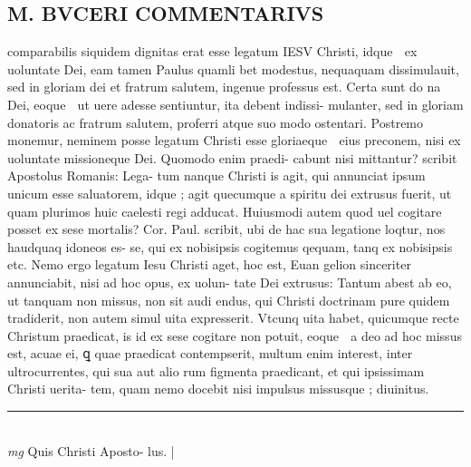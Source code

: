 \documentclass{article}
\begin{document}
\begin{pages}
\section*{M. BVCERI COMMENTARIVS }
\marginpar{[ p.18 ]}\pstart comparabilis siquidem dignitas erat esse legatum IESV Christi, idque  ex uoluntate Dei, eam tamen Paulus quamli bet modestus, nequaquam dissimulauit, sed in gloriam dei et fratrum salutem, ingenue professus est. Certa sunt do na Dei, eoque  ut uere adesse sentiuntur, ita debent indissi- mulanter, sed in gloriam donatoris ac fratrum salutem, proferri atque suo modo ostentari.  Postremo monemur, neminem posse legatum Christi esse gloriaeque  eius preconem, nisi ex uoluntate missioneque Dei.  Quomodo enim praedi- cabunt nisi mittantur? scribit Apostolus Romanis: Lega- tum nanque  Christi is agit, qui annunciat ipsum unicum esse saluatorem, idque ; agit quecumque  a spiritu dei extrusus fuerit, ut quam plurimos huic caelesti regi adducat.  Huiusmodi autem quod uel cogitare posset ex sese mortalis? Cor. Paul.  scribit, ubi de hac sua legatione loqtur, nos haudquaq idoneos es- se, qui ex nobisipsis cogitemus qequam, tanq ex nobisipsis etc.  Nemo ergo legatum Iesu Christi aget, hoc est, Euan gelion sinceriter annunciabit, nisi ad hoc opus, ex uolun- tate Dei extrusus:  \pend\pstart Tantum abest ab eo, ut tanquam non missus, non sit audi endus, qui Christi doctrinam pure quidem tradiderit, non autem simul uita expresserit. Vtcunq uita habet, quicumque recte Christum praedicat, is id ex sese cogitare non potuit, eoque  a deo ad hoc missus est, acuae ei, ꝗ quae praedicat contempserit, multum enim interest, inter ultrocurrentes, qui sua aut alio rum figmenta praedicant, et qui ipsissimam Christi uerita- tem, quam nemo docebit nisi impulsus missusque ; diuinitus.   \pend
\vspace{0.5cm}\noindent
\vspace{0.2cm}\rule{1cm}{0.2pt}\\ 
\hspace{0.2cm}\textit{mg}
\footnotesize Quis Christi Aposto- lus.  
\normalsize| 

\end{pages}
\end{document}
